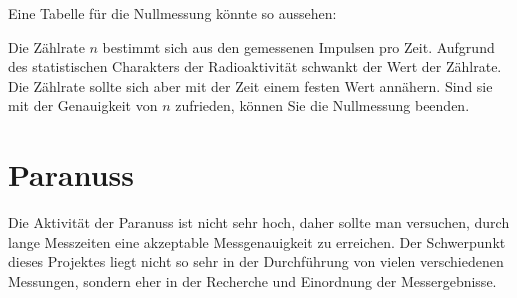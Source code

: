 \documentclass[12pt,a4paper, twosite]{article}
\begin{document}
Eine Tabelle für die Nullmessung könnte so aussehen:

\usetikzlibrary{matrix}


Die Zählrate $n$ bestimmt sich aus den gemessenen Impulsen pro Zeit.
Aufgrund des statistischen Charakters der Radioaktivität schwankt der Wert der Zählrate. Die Zählrate sollte sich aber mit der Zeit einem
festen Wert annähern. Sind sie mit der Genauigkeit von $n$ zufrieden, können Sie die Nullmessung beenden.

\section*{Paranuss}
Die Aktivität der Paranuss ist nicht sehr hoch, daher sollte man versuchen, durch lange Messzeiten 
eine akzeptable Messgenauigkeit zu erreichen. Der Schwerpunkt dieses Projektes liegt nicht so sehr in
der Durchführung von vielen verschiedenen Messungen, sondern eher in der Recherche und Einordnung der Messergebnisse. 
\end{document}
